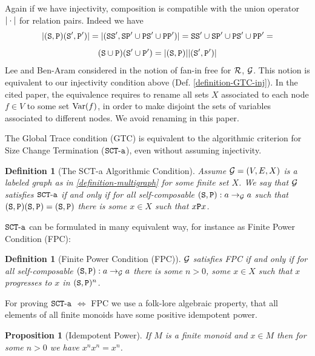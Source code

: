 \documentclass{lmcs}
\newtheorem{proposition}[theorem]{Proposition}
\newtheorem{definition}[theorem]{Definition}
\begin{document}
Again if we have injectivity, composition is
compatible with the union operator $\universe{\cdot}$ for relation pairs. 
Indeed we have
$$
\universe{(\Stat,\Prog)(\Stat',\Prog')} 
= 
\universe{
(\Stat \Stat', 
\Stat \Prog' \cup \Prog \Stat' \cup \Prog \Prog')
}
=
\Stat \Stat' \cup \Stat \Prog' \cup \Prog \Stat' \cup \Prog \Prog'
=
$$
$$
(\Stat \cup \Prog) (\Stat' \cup \Prog') 
= 
\universe{(\Stat,\Prog)}\universe{(\Stat',\Prog')} 
$$
Lee and Ben-Aram considered in \cite{Lee2} the notion
of fan-in free for $\setR$, $\setG$. 
This notion is equivalent to our injectivity condition above 
(Def. \ref{definition-GTC-inj}). In the cited paper, the equivalence requires to
rename all sets $X$ associated to each node $f \in V$ to some set
$\Var(f)$, in order to make disjoint the sets of variables associated
to different nodes. We avoid renaming in this paper.

The Global Trace condition (GTC) is equivalent to the algorithmic 
criterion for Size Change Termination ($\SCTa$), even without assuming injectivity.

\begin{definition}[The SCT-a Algorithmic Condition]
\label{definition-SCT}
Assume $\setG=(V,E,X)$ is a labeled graph as in \ref{definition-multigraph} for some
finite set $X$.
We say that $\setG$ satisfies $\SCTa$ if and only if for all self-composable 
$\composable{\setG}{a}{a}{(\Stat,\Prog)}$ such that 
$(\Stat,\Prog) (\Stat,\Prog) = (\Stat,\Prog)$ there is some $x \in X$ such that $x \Prog x$.
\end{definition}

$\SCTa$ can be formulated in many equivalent way, for instance as Finite Power Condition (FPC):

\begin{definition}[Finite Power Condition (FPC)]
\label{definition-FPC}
$\setG$ satisfies FPC if and only if for all self-composable 
$\composable{\setG}{a}{a}{(\Stat,\Prog)}$ there is some $n > 0 $, some
$x \in X$ such that $x$ progresses to $x$ in $(\Stat,\Prog)^n$.
\end{definition}

For proving $\SCTa$ $\Leftrightarrow$ FPC we use a folk-lore
algebraic property, that all elements of all finite monoids have some positive idempotent power.

\begin{proposition}[Idempotent Power]
\label{proposition-idempotent-power}
If $M$ is a finite monoid and $x \in M$ then for some $n>0$ we have $x^nx^n=x^n$.
\end{proposition}
\end{document}
